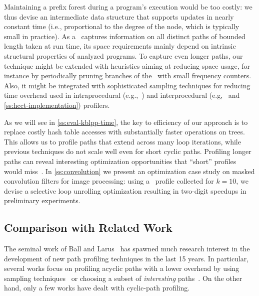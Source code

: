 Maintaining a prefix forest during a program's execution would be too costly: we thus devise an intermediate data structure that supports updates in nearly constant time (i.e., proportional to the degree of the node, which is typically small in practice). As a \ksf\ captures information on all distinct paths of bounded length taken at run time, its space requirements mainly depend on intrinsic structural properties of analyzed programs. To capture even longer paths, our technique might be extended with heuristics aiming at reducing space usage, for instance by periodically pruning branches of the \ksf\ with small frequency counters. Also, it might be integrated with sophisticated sampling techniques for reducing time overhead used in intraprocedural (e.g.,~\cite{Bond05}) and interprocedural (e.g,~\cite{Zhuang06} and \mysection\ref{ss:hcct-implementation}) profilers.

As we will see in \mysection\ref{ss:eval-kblpp-time}, the key to efficiency of our approach is to replace costly hash table accesses with substantially faster operations on trees. This allows us to profile paths that extend across many loop iterations, while previous techniques do not scale well even for short cyclic paths. Profiling longer paths can reveal interesting optimization opportunities that ``short'' profiles would miss~\cite{Delia13}. In \mysection\ref{ss:convolution} we present an optimization case study on masked convolution filters for image processing: using a \kipf\ profile collected for $k=10$, we devise a selective loop unrolling optimization resulting in two-digit speedups in preliminary experiments.




\subsection{Comparison with Related Work}
\label{ss:kblpp-related}

The seminal work of Ball and Larus~\cite{Ball96} has spawned much research interest in the development of new path profiling techniques in the last 15 years. In particular, several works focus on profiling acyclic paths with a lower overhead by using sampling techniques~\cite{Bond05,Bond05b} or choosing a subset of {\em interesting} paths~\cite{Apiwattanapong02,Joshi04,Vaswani07}.
On the other hand, only a few works have dealt with cyclic-path profiling.

